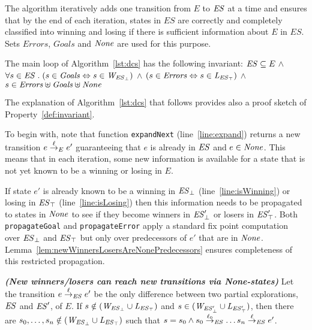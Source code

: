 The algorithm iteratively adds one transition from $E$ to $\mathit{ES}$ at a time and ensures 
that by the end of each iteration, states in $ES$ are correctly and completely classified into 
winning and losing if there is sufficient information about $E$ in $ES$. Sets $Errors$, 
$Goals$ and $\mathit{None}$ are used for this purpose. 

\begin{property}[Invariant]
\label{def:invariant}
The  main loop of Algorithm~\ref{lst:dcs} has the following 
invariant: 
$\mathit{ES} \subseteq E \ \wedge $ $\forall s \in \mathit{ES} \;.\; (s\in\mathit{Goals} 
\Leftrightarrow 
s \in 
\mathit{W_{\mathit{\mathit{ES}_{\bot}}}})$ $\wedge$  $(s\in\mathit{Errors} 
\Leftrightarrow s \in \mathit{L_{\mathit{\mathit{ES}_{\top}}}})$ $\wedge$  
$s\in\mathit{Errors}\uplus\mathit{Goals}\uplus\mathit{None}$

\end{property}

The explanation of Algorithm~\ref{lst:dcs} that follows provides also 
a proof sketch of Property~\ref{def:invariant}.   

To begin with, note that function \texttt{expandNext} 
(line~\ref{line:expand}) returns a new transition 
$e \overset{\ell}{\rightarrow}_{E} e'$ 
guaranteeing that $e$ is already in $\mathit{ES}$ and $e \in \mathit{None}$. 
This means that in each iteration, some new information is available 
for a state that is not yet known to be a 
winning or losing in $E$.  

If state $e'$ is already known to be a winning in 
$\mathit{\mathit{ES}_{\bot}}$ (line~\ref{line:isWinning}) or 
losing in $\mathit{\mathit{ES}_{\top}}$ (line~\ref{line:isLosing}) 
then this information needs to be propagated to states in $\mathit{None}$ 
to see if they become winners in 
$\mathit{\mathit{ES}'_{\bot}}$ or losers in 
$\mathit{\mathit{ES}'_{\top}}$. Both \texttt{propagateGoal} and 
\texttt{propagateError} apply a standard fix point 
computation~\cite{Ramadge:1989:CDES} over 
$\mathit{\mathit{ES}_{\bot}}$ and 
$\mathit{\mathit{ES}_{\top}}$ but only over predecessors of $e'$ 
that are in $\mathit{None}$. 
Lemma~\ref{lem:newWinnersLosersAreNonePredecessors} ensures 
completeness of this 
restricted propagation.

\begin{lemma}\textbf{\emph{(New winners/losers can reach 
new transitions via \textit{None}-states)}}
\label{lem:newWinnersLosersAreNonePredecessors}
Let the transition $e \overset{\ell}{\rightarrow}_{\mathit{ES}} e'$ be the only difference between two partial explorations, $\mathit{ES}$ and $\mathit{ES}'$, of $E$. If $s \notin (\mathit{W_{\mathit{\mathit{ES}_{\bot}}}} \cup \mathit{L_{\mathit{\mathit{ES}_{\top}}}})$ and $s \in (\mathit{W_{\mathit{\mathit{ES}'_{\bot}}}} \cup \mathit{L_{\mathit{\mathit{ES}'_{\top}}}})$, then there are $s_0, \ldots, s_n \notin (\mathit{W_{\mathit{\mathit{ES}_{\bot}}}} \cup \mathit{L_{\mathit{\mathit{ES}_{\top}}}})$ such that $s = s_0 \wedge
s_0 \overset{\ell_0}{\rightarrow}_{\mathit{ES}}\ldots s_{n} \overset{\ell}{\rightarrow}_{\mathit{ES}} e'$.
\end{lemma}

